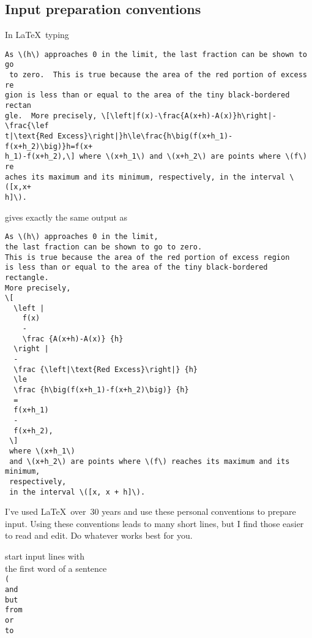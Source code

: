 
\subsection{Input preparation conventions}

In \LaTeX\ typing

\begin{verbatim}
As \(h\) approaches 0 in the limit, the last fraction can be shown to go
 to zero.  This is true because the area of the red portion of excess re
gion is less than or equal to the area of the tiny black-bordered rectan
gle.  More precisely, \[\left|f(x)-\frac{A(x+h)-A(x)}h\right|-\frac{\lef
t|\text{Red Excess}\right|}h\le\frac{h\big(f(x+h_1)-f(x+h_2)\big)}h=f(x+
h_1)-f(x+h_2),\] where \(x+h_1\) and \(x+h_2\) are points where \(f\) re
aches its maximum and its minimum, respectively, in the interval \([x,x+
h]\).
\end{verbatim}

gives exactly the same output as

\begin{verbatim}
As \(h\) approaches 0 in the limit,
the last fraction can be shown to go to zero.
This is true because the area of the red portion of excess region
is less than or equal to the area of the tiny black-bordered rectangle.
More precisely,
\[
  \left |
    f(x)
    -
    \frac {A(x+h)-A(x)} {h}
  \right |
  -
  \frac {\left|\text{Red Excess}\right|} {h}
  \le
  \frac {h\big(f(x+h_1)-f(x+h_2)\big)} {h}
  =
  f(x+h_1)
  -
  f(x+h_2),
 \]
 where \(x+h_1\)
 and \(x+h_2\) are points where \(f\) reaches its maximum and its minimum,
 respectively,
 in the interval \([x, x + h]\).
\end{verbatim}


I've used \LaTeX\ over~30 years
and use these personal conventions
to prepare input.
Using these conventions leads
to many short lines,
but I find those easier
to read and edit.
Do whatever works best for you.

 start input lines with\\
   the first word of a sentence\\
   \verb+(+\\
   \verb+and+\\
   \verb+but+\\
   \verb+from+\\
   \verb+or+\\
   \verb+to+


